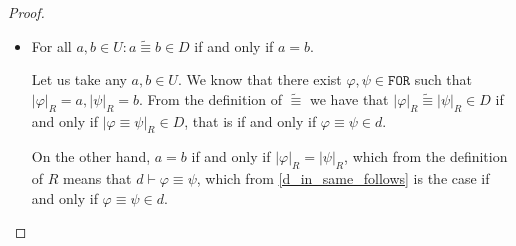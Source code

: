 \documentclass{article}
\theoremstyle{definition}
\theoremstyle{definition}
\theoremstyle{definition}
\theoremstyle{definition}
\theoremstyle{definition}
\newcommand*{\id}{\equiv}
\newcommand*{\ra}{\rightarrow}
\newcommand*{\FOR}{\texttt{FOR}}
\newcommand{\PC}{$\mathsf{PC}$\xspace}
\begin{document}
\begin{proof}
\begin{itemize}
\begin{itemize}
                        Let $\Psi$ be a proof of $\lnot \varphi \ra \hat{\varphi}$ in $d_{l-1}$ with a
                        proof of $\psi \ra \hat{\varphi}$ in $d_{j-1}$ appended to it. Then let us
                        append to $\Psi$ a formula $(\lnot \varphi \ra \hat{\varphi}) \ra ((\psi \ra
                            \hat{\varphi}) \ra ((\varphi \ra \psi)\ra \hat{\varphi}))$ which is an instance
                        of a \PC theorem $(\lnot \alpha \ra \gamma) \ra ((\beta \ra \gamma) \ra
                            ((\alpha \ra \beta) \ra \gamma))$. Them by \emph{modus ponens} we can infer
                        $(\psi \ra \hat{\varphi}) \ra ((\varphi \ra \psi)\ra \hat{\varphi})$ and
                        $(\varphi \ra \psi)\ra \hat{\varphi}$ arriving at the proof of $(\varphi \ra
                            \psi) \ra \hat{\varphi}$ in $d_{k-1}$, thus showing that $\varphi \ra \psi \not
                            \in d$.
              \end{itemize}
        \item For all $a, b \in U: a \tilde{\id}b \in D$ if and only if $a = b$.

              Let us take any $a,b \in U$. We know that there exist $\varphi, \psi \in \FOR$
              such that $|\varphi|_R = a, |\psi|_R = b$. From the definition of $\tilde{\id}$
              we have that $|\varphi|_R \tilde{\id} |\psi|_R \in D$ if and only if $|\varphi
                  \id \psi|_R \in D$, that is if and only if $\varphi \id \psi \in d$.

              On the other hand, $a = b$ if and only if $|\varphi|_R = |\psi|_R$, which from
              the definition of $R$ means that $d \vdash \varphi \id \psi$, which from
              \cref{d_in_same_follows} is the case if and only if $\varphi \id \psi \in d$.


\end{itemize}
\end{proof}
\end{document}
